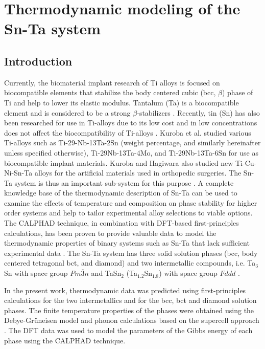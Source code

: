 \chapter{Thermodynamic modeling of the Sn-Ta system}

\section{Introduction}

Currently, the biomaterial implant research of Ti alloys is focused on biocompatible elements that stabilize the body centered cubic (bcc, $\beta$) phase of Ti and help to lower its elastic modulus. Tantalum (Ta) is a biocompatible element and is considered to be a strong $\beta$-stabilizers \cite{Brailovski2011b}. Recently, tin (Sn) has also been researched for use in Ti-alloys due to its low cost and in low concentrations does not affect the biocompatibility of Ti-alloys \cite{Niinomi2012}. Kuroba et al. \cite{Kuroda1998} studied various Ti-alloys such as Ti-29-Nb-13Ta-2Sn (weight percentage, and similarly hereinafter unless specified otherwise), Ti-29Nb-13Ta-4Mo, and Ti-29Nb-13Ta-6Sn for use as biocompatible implant materials. Kuroba and Hagiwara \cite{He2004} also studied new Ti-Cu-Ni-Sn-Ta alloys for the artificial materials used in orthopedic surgeries. The Sn-Ta system is thus an important sub-system for this purpose \cite{He2006}.  A complete knowledge base of the thermodynamic description of Sn-Ta can be used to examine the effects of temperature and composition on phase stability for higher order systems and help to tailor experimental alloy selections to viable options. The CALPHAD technique, in combination with DFT-based first-principles calculations, has been proven to provide valuable data to model the thermodynamic properties of binary systems such as Sn-Ta that lack sufficient experimental data \cite{Liu2009}. The Sn-Ta system has three solid solution phases (bcc, body centered tetragonal bct, and diamond) and two intermetallic compounds, i.e. Ta$_{3}$Sn with space group $Pm\overline{3}n$ and TaSn$_{2}$ (Ta$_{1.2}$Sn$_{1.8}$) with space group $Fddd$ \cite{Okamoto2003}.

 In the present work, thermodynamic data was predicted using first-principles calculations for the two intermetallics and for the bcc, bct and diamond solution phases. The finite temperature properties of the phases were obtained using the Debye-Gr\"uneisen model \cite{Shang2010} and phonon calculations based on the supercell approach \cite{Wang2012}. The DFT data was used to model the parameters of the Gibbs energy of each phase using the CALPHAD technique.

